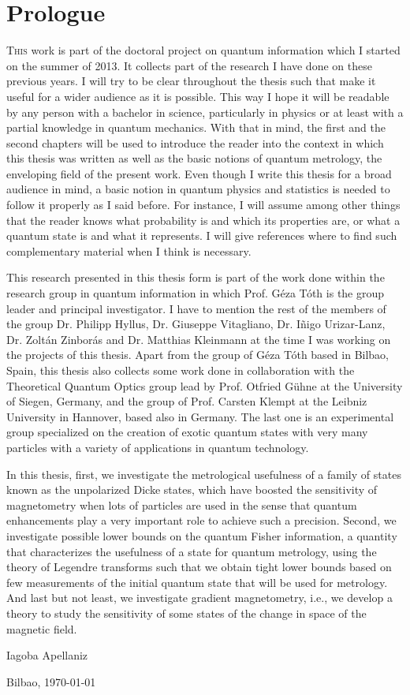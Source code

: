 \section*{Prologue}
\setcounter{page}{1}
\fancyfoot[LE,RO]{\thepage}

\lettrine[lines=2, findent=3pt,nindent=0pt]{T}{his} work is part of the doctoral project on quantum information which I started on the summer of 2013.
It collects part of the research I have done on these previous years.
I will try to be clear throughout the thesis such that make it useful for a wider audience as it is possible.
This way I hope it will be readable by any person with a bachelor in science, particularly in physics or at least with a partial knowledge in quantum mechanics.
With that in mind, the first and the second chapters will be used to introduce the reader into the context in which this thesis was written as well as the basic notions of quantum metrology, the enveloping field of the present work.
Even though I write this thesis for a broad audience in mind, a basic notion in quantum physics and statistics is needed to follow it properly as I said before.
For instance, I will assume among other things that the reader knows what probability is and which its properties are, or what a quantum state is and what it represents.
I will give references where to find such complementary material when I think is necessary.

This research presented in this thesis form is part of the work done within the research group in quantum information in which Prof.
G\'eza T\'oth is the group leader and principal investigator.
I have to mention the rest of the members of the group Dr. Philipp Hyllus, Dr. Giuseppe Vitagliano, Dr. I\~nigo Urizar-Lanz, Dr. Zolt\'an Zinbor\'as and Dr. Matthias Kleinmann at the time I was working on the projects of this thesis.
Apart from the group of G\'eza T\'oth based in Bilbao, Spain, this thesis also collects some work done in collaboration with the Theoretical Quantum Optics group lead by Prof. Otfried G\"uhne at the University of Siegen, Germany, and the group of Prof. Carsten Klempt at the Leibniz University in Hannover, based also in Germany.
The last one is an experimental group specialized on the creation of exotic quantum states with very many particles with a variety of applications in quantum technology.

In this thesis, first, we investigate the metrological usefulness of a family of states known as the unpolarized Dicke states, which have boosted the sensitivity of magnetometry when lots of particles are used in the sense that quantum enhancements play a very important role to achieve such a precision.
Second, we investigate possible lower bounds on the quantum Fisher information, a quantity that characterizes the usefulness of a state for quantum metrology, using the theory of Legendre transforms such that we obtain tight lower bounds based on few measurements of the initial quantum state that will be used for metrology.
And last but not least, we investigate gradient magnetometry, i.e., we develop a theory to study the sensitivity of some states of the change in space of the magnetic field.

\begin{flushright}
  Iagoba Apellaniz

  Bilbao, \today
\end{flushright}

